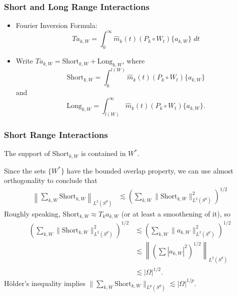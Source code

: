 \documentclass[usenames,dvipsnames,10pt]{beamer}
\begin{document}
\begin{frame}
    \frametitle{Short and Long Range Interactions}

    \begin{itemize}
        \item Fourier Inversion Formula:
        \[ Ta_{k,W} = \int_0^\infty \widehat{m}_k(t) (P_k \circ W_t) \{ a_{k,W} \}\; dt \]
        \pause

        \item Write $Ta_{k,W} = \text{Short}_{k,W} + \text{Long}_{k,W}$, where
        \[ \text{Short}_{k,W} = \int_0^{l(W)}\widehat{m}_k(t) (P_k \circ W_t) \{ a_{k,W} \} \]
        and
        \[ \text{Long}_{k,W} = \int_{l(W)}^\infty \widehat{m}_k(t) (P_k \circ W_t) \{ a_{k,W} \}. \]
    \end{itemize}
\end{frame}




\begin{frame}
    \frametitle{Short Range Interactions}

    The support of $\text{Short}_{k,W}$ is contained in $W^*$.
    \vspace{1em}

    \pause
    Since the sets $\{ W^* \}$ have the bounded overlap property, we can use almost orthogonality to conclude that
        \begin{align*}
            \left\| \sum\nolimits_{k,W} \text{Short}_{k,W} \right\|_{L^2(S^d)} &\lesssim \left( \sum\nolimits_{k,W} \| \text{Short}_{k,W} \|_{L^2(S^d)}^2 \right)^{1/2}
        \end{align*}
        \pause 
        Roughly speaking, $\text{Short}_{k,W} \approx T_k a_{k,W}$ (or at least a smoothening of it), so
        \begin{align*}
            \left( \sum\nolimits_{k,W} \| \text{Short}_{k,W} \|_{L^2(S^d)}^2 \right)^{1/2} &\lesssim \left( \sum \nolimits_{k,W} \| a_{k,W} \|_{L^2(S^d)}^2 \right)^{1/2}\\
            &\lesssim \left\| \left( \sum |a_{k,W}|^2 \right)^{1/2} \right\|_{L^2(S^d)}\\
            &\lesssim |\Omega|^{1/2}.
        \end{align*}
        \pause 
        H\"{o}lder's inequality implies $\| \sum\nolimits_{k,W} \text{Short}_{k,W} \|_{L^p(S^d)} \lesssim |\Omega|^{1/p}$.
\end{frame}
\end{document}
